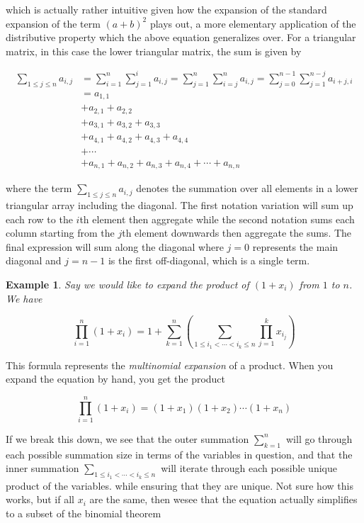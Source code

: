 \documentclass[12pt]{article}
\theoremstyle{plain}
\newtheorem*{example}{Example}
\theoremstyle{definition}
\begin{document}
which is actually rather intuitive given how the expansion of the standard expansion of the term $(a+b)^2$ plays out, a more elementary application of the distributive property which the above equation generalizes over. For a triangular matrix, in this case the lower triangular matrix, the sum is given by

\begin{align*}
    \sum_{1 \leq j \leq n}^{} a_{i,j} &= \sum_{i=1}^{n} \sum_{j=1}^{i} a_{i, j} = 
    \sum_{j=1}^{n} \sum_{i=j}^{n} a_{i, j} = 
    \sum_{j=0}^{n-1} \sum_{j=1}^{n-j} a_{i+j, i} \\
    &= a_{1, 1} \\
    & + a_{2, 1} + a_{2, 2}  \\
    & + a_{3, 1} + a_{3, 2} + a_{3, 3} \\
    & + a_{4, 1} + a_{4, 2} + a_{4, 3} + a_{4, 4} \\
    & + \cdots \\
    & + a_{n, 1} + a_{n, 2} + a_{n, 3} + a_{n, 4} + \cdots + a_{n, n}
\end{align*}

where the term $\sum_{1 \leq j \leq n}^{} a_{i,j}$ denotes the summation over all elements in a lower triangular array including the diagonal. The first notation variation will sum up each row to the $i$th element then aggregate while the second notation sums each column starting from the $j$th element downwards then aggregate the sums. The final expression will sum along the diagonal where $j=0$ represents the main diagonal and $j=n-1$ is the first off-diagonal, which is a single term. 

\begin{example}
    Say we would like to expand the product of $\left(1 + x_i\right)$ from $1$ to $n$. We have 

    $$\prod_{i=1}^{n} \left(1 + x_i\right) = 1 + \sum_{k=1}^{n} \left(\sum_{1 \leq i_1 < \cdots < i_k \leq n} \prod_{j=1}^{k} x_{i_j}\right)$$
\end{example}

This formula represents the \textit{multinomial expansion} of a product. When you expand the equation by hand, you get the product

$$\prod_{i=1}^{n} \left(1 + x_i\right) = (1 + x_1)(1 + x_2)\cdots(1 + x_n)$$

If we break this down, we see that the outer summation $\sum_{k=1}^{n}$ will go through each possible summation size in terms of the variables in question, and that the inner summation $\sum_{1 \leq i_1 < \cdots < i_k \leq n}$ will iterate through each possible unique product of the variables. while ensuring that they are unique. Not sure how this works, but if all $x_i$ are the same, then wesee that the equation actually simplifies to a subset of the binomial theorem 
\end{document}
